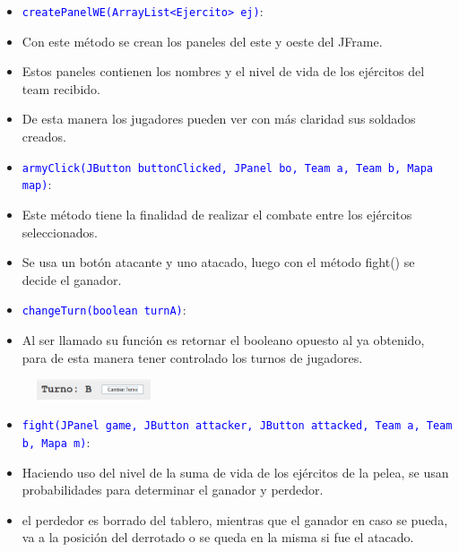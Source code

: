 \documentclass{article}
\begin{document}

\begin{itemize}
    \item \texttt{\textcolor{blue}{createPanelWE(ArrayList<Ejercito> ej)}}: 
    \item Con este método se crean los paneles del este y oeste del JFrame.
    \item Estos paneles contienen los nombres y el nivel de vida de los ejércitos del team recibido.
    \item De esta manera los jugadores pueden ver con más claridad sus soldados creados.
\end{itemize}

\begin{itemize}
    \item \texttt{\textcolor{blue}{armyClick(JButton buttonClicked, JPanel bo, Team a, Team b, Mapa map)}}: 
    \item Este método tiene la finalidad de realizar el combate entre los ejércitos seleccionados.
    \item Se usa un botón atacante y uno atacado, luego con el método fight() se decide el ganador.
\end{itemize}

\begin{itemize}
    \item \texttt{\textcolor{blue}{changeTurn(boolean turnA)}}: 
    \item Al ser llamado su función es retornar el booleano opuesto al ya obtenido, para de esta manera tener controlado los turnos de jugadores.
\end{itemize}
\begin{figure}[H]
    \centering
    \includegraphics[width=0.3\textwidth,keepaspectratio]{img/vj3.png}
    \caption{}
\end{figure}

\begin{itemize}
    \item \texttt{\textcolor{blue}{fight(JPanel game, JButton attacker, JButton attacked, Team a, Team b, Mapa m)}}: 
    \item Haciendo uso del nivel de la suma de vida de los ejércitos de la pelea, se usan probabilidades para determinar el ganador y perdedor.
    \item el perdedor es borrado del tablero, mientras que el ganador en caso se pueda, va a la posición del derrotado o se queda en la misma si fue el atacado.
\end{itemize}
\end{document}
